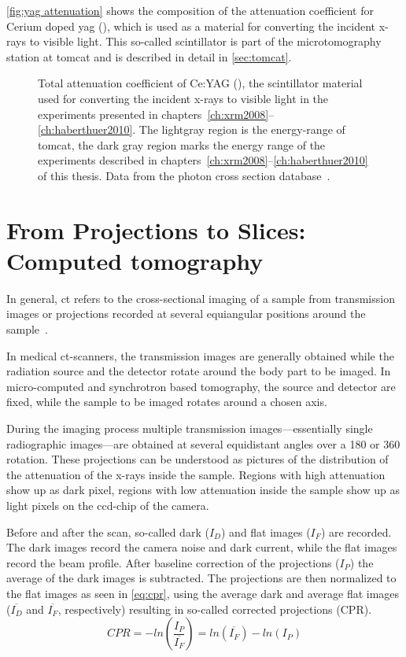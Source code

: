 \autoref{fig:yag attenuation} shows the composition of the attenuation coefficient for Cerium doped \ac{yag} (), which is used as a material for converting the incident x-rays to visible light. This so-called scintillator is part of the microtomography station at \ac{tomcat} and is described in detail in \autoref{sec:tomcat}.

\def\width{\linewidth}%
\def\height{0.618\linewidth}%
\begin{figure}
	\noindent\makebox[\textwidth]{%
		\centering
		}
	\caption[Total attenuation coefficient of Ce:YAG]{Total attenuation coefficient of Ce:YAG (), the scintillator material used for converting the incident x-rays to visible light in the experiments presented in chapters~\ref{ch:xrm2008}--\ref{ch:haberthuer2010}. The lightgray region is the energy-range of \ac{tomcat}, the dark gray region marks the energy range of the experiments described in chapters~\autoref{ch:xrm2008}--\ref{ch:haberthuer2010} of this thesis. Data from the photon cross section database~\cite{XCOM}.}
	\label{fig:yag attenuation}
\end{figure}

\section{From Projections to Slices: Computed tomography}
In general, \ac{ct} refers to the cross-sectional imaging of a sample from transmission images or projections recorded at several equiangular positions around the sample~\cite{Kak2002}.

In medical \ac{ct}-scanners, the transmission images are generally obtained while the radiation source and the detector rotate around the body part to be imaged. In micro-computed and synchrotron based tomography, the source and detector are fixed, while the sample to be imaged rotates around a chosen axis.

During the imaging process multiple transmission images---essentially single radiographic images---are obtained at several equidistant angles over a \unit{180}{\degree} or \unit{360}{\degree} rotation. These projections can be understood as pictures of the distribution of the attenuation of the x-rays inside the sample. Regions with high attenuation show up as dark pixel, regions with low attenuation inside the sample show up as light pixels on the \ac{ccd}-chip of the camera.

Before and after the scan, so-called dark ($I_{D}$) and flat images ($I_{F}$) are recorded. The dark images record the camera noise and dark current, while the flat images record the beam profile. After baseline correction of the projections ($I_{P}$) the average of the dark images is subtracted. The projections are then normalized to the flat images as seen in \autoref{eq:cpr}, using the average dark and average flat images ($\overline{I_{D}}$ and $\overline{I_{F}}$, respectively) resulting in so-called corrected projections (CPR).%
\begin{equation}%
	CPR=-ln\left(\frac{I_{P}}{\overline{I_{F}}}\right)=ln(\overline{I_{F}})-ln(I_{P})%
	\label{eq:cpr}%
\end{equation}%

